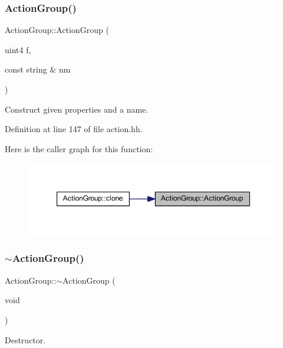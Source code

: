 \subsubsection{\texorpdfstring{ActionGroup()}{ActionGroup()}}
{\footnotesize\ttfamily Action\+Group\+::\+Action\+Group (\begin{DoxyParamCaption}\item[{uint4}]{f,  }\item[{const string \&}]{nm }\end{DoxyParamCaption})\hspace{0.3cm}{\ttfamily [inline]}}



Construct given properties and a name. 



Definition at line 147 of file action.\+hh.

Here is the caller graph for this function\+:
\nopagebreak
\begin{figure}[H]
\begin{center}
\leavevmode
\includegraphics[width=347pt]{class_action_group_a36259f8d2aef3e00f7fb8688331653f6_icgraph}
\end{center}
\end{figure}
\mbox{\label{class_action_group_aa7225f652d1984bc106a3b208366de82}} 
\subsubsection{\texorpdfstring{$\sim$ActionGroup()}{~ActionGroup()}}
{\footnotesize\ttfamily Action\+Group\+::$\sim$\+Action\+Group (\begin{DoxyParamCaption}\item[{void}]{ }\end{DoxyParamCaption})\hspace{0.3cm}{\ttfamily [virtual]}}



Destructor. 



